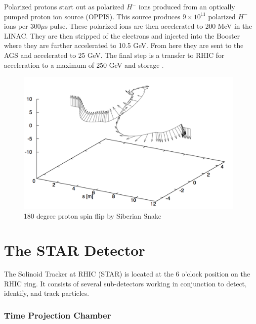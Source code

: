 \documentclass[abstract = on,listof=totoc, bibliography=totoc]{scrreprt}
\begin{document}
Polarized protons start out as polarized $H^-$ ions produced from an optically pumped proton ion source (OPPIS).  This source produces $9\times 10^{11}$ polarized $H^-$ ions per 300$\mu$s pulse. These polarized ions are then accelerated to 200 MeV in the LINAC. They are then stripped of the electrons and injected into the Booster where they are further accelerated to 10.5 GeV. From here they are sent to the AGS and accelerated to 25 GeV. The final step is a transfer to RHIC for acceleration to a maximum of 250 GeV and storage \cite{ppCollider}.
\begin{figure}
\begin{center}
\includegraphics[width = 1\textwidth]{spinFlipFromPaper}
\caption[Spin flip by Siberian Snake]{180 degree proton spin flip by Siberian Snake}
\label{fig:spinFlip}
\end{center}
\end{figure}



\FloatBarrier

\section{The STAR Detector}
The Solinoid Tracker at RHIC (STAR) is located at the 6 o'clock position on the RHIC ring. It consists of several sub-detectors working in conjunction to detect, identify, and track particles. 

\subsubsection[TPC]{Time Projection Chamber}
\end{document}
